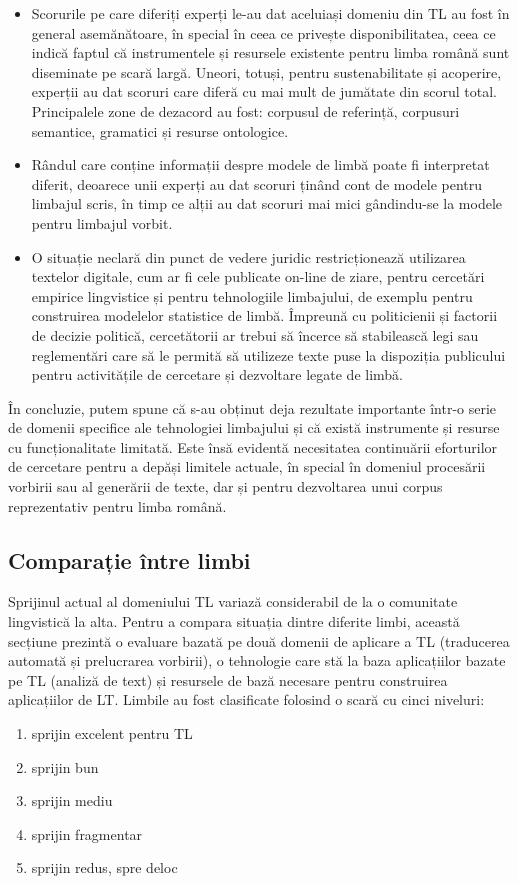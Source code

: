 \begin{multicols}{2}
\begin{itemize}
\item Scorurile pe care diferiți experți le-au dat aceluiași domeniu din TL au fost în general asemănătoare, în special în ceea ce privește disponibilitatea, ceea ce indică faptul că instrumentele și resursele existente pentru limba română sunt diseminate pe scară largă. Uneori, totuși, pentru sustenabilitate și acoperire, experții au dat scoruri care diferă cu mai mult de jumătate din scorul total. Principalele zone de dezacord au fost: corpusul de referință, corpusuri semantice, gramatici și resurse ontologice.\vspace*{-0.15 cm}
\item Rândul care conține informații despre modele de limbă poate fi interpretat diferit, deoarece unii experți au dat scoruri ținând cont de modele pentru limbajul scris, în timp ce alții au dat scoruri mai mici gândindu-se la modele pentru limbajul vorbit. 
\item O situație neclară din punct de vedere juridic restricționează utilizarea textelor digitale, cum ar fi cele publicate on-line de ziare, pentru cercetări empirice lingvistice și pentru tehnologiile limbajului, de exemplu pentru construirea modelelor statistice de limbă. Împreună cu politicienii și factorii de decizie politică, cercetătorii ar trebui să încerce să stabilească legi sau reglementări care să le permită să utilizeze texte puse la dispoziția publicului pentru activitățile de cercetare și dezvoltare legate de limbă.
\end{itemize}

În concluzie, putem spune că s-au obținut deja rezultate importante \mbox{într-o} serie de domenii specifice ale tehnologiei limbajului și că există instrumente și resurse cu funcționalitate limitată. Este însă evidentă necesitatea continuării eforturilor de cercetare pentru a depăși limitele actuale, în special în domeniul procesării vorbirii sau al generării de texte, dar și pentru dezvoltarea unui corpus reprezentativ pentru limba română.

\subsection{Comparație între limbi}

Sprijinul actual al domeniului TL variază considerabil de la o comunitate lingvistică la alta. Pentru a compara situația dintre diferite limbi, această secțiune prezintă o evaluare bazată pe două domenii de aplicare a TL (traducerea automată și prelucrarea vorbirii), o tehnologie care stă la baza aplicațiilor bazate pe TL (analiză de text) și resursele de bază necesare pentru construirea aplicațiilor de LT.
Limbile au fost clasificate folosind o scară cu cinci niveluri:
\begin{enumerate}
      \item sprijin excelent pentru TL
      \item sprijin bun
      \item sprijin mediu
      \item sprijin fragmentar
      \item sprijin redus, spre deloc
\end{enumerate}


\end{multicols}
